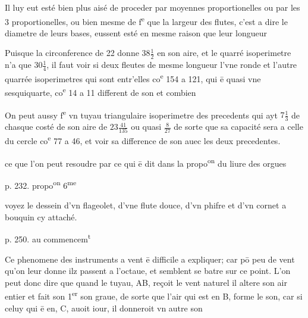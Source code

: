 \documentclass[11pt,a4paper]{article}
\begin{document}
Il luy eut esté bien plus aisé de proceder par moyennes proportionelles ou par les 3 proportionelles, ou bien mesme de f\textsuperscript{e} que la largeur des flutes, c'est a dire le diametre de leurs bases, eussent esté en mesme raison que leur longueur

Puisque la circonference de 22 donne $38\frac{1}{2}$ en son aire, et le quarré isoperimetre n'a que $30\frac{1}{4}$, il faut voir si deux fleutes de mesme longueur l'vne ronde et l'autre quarrée isoperimetres qui sont entr'elles co\textsuperscript{e} 154 a 121, qui ē quasi vne sesquiquarte, co\textsuperscript{e} 14 a 11 different de son et combien

On peut aussy f\textsuperscript{e} vn tuyau triangulaire isoperimetre des precedents qui ayt $7\frac{1}{3}$ de chasque costé de son aire de $23\frac{41}{135}$ ou quasi $\frac{8}{27}$ de sorte que sa capacité sera a celle du cercle co\textsuperscript{e} 77 a 46, et voir sa difference de son auec les deux precedentes.

ce que l'on peut resoudre par ce qui ē dit dans la propo\textsuperscript{on} \quad du liure des orgues

p. 232. propo\textsuperscript{on} 6\textsuperscript{me}

voyez le dessein d'vn flageolet, d'vne flute douce, d'vn phifre et d'vn cornet a bouquin cy attaché.

p. 250. au commencem\textsuperscript{t}

Ce phenomene des instruments a vent ē difficile a expliquer; car pō peu de vent qu'on leur donne ilz passent a l'octaue, et semblent se batre sur ce point. L'on peut donc dire que quand le tuyau, AB, reçoit le vent naturel il altere son air entier et fait son 1\textsuperscript{er} son graue, de sorte que l'air qui est en B, forme le son, car si celuy qui ē en, C, auoit iour, il donneroit vn autre son
\end{document}
